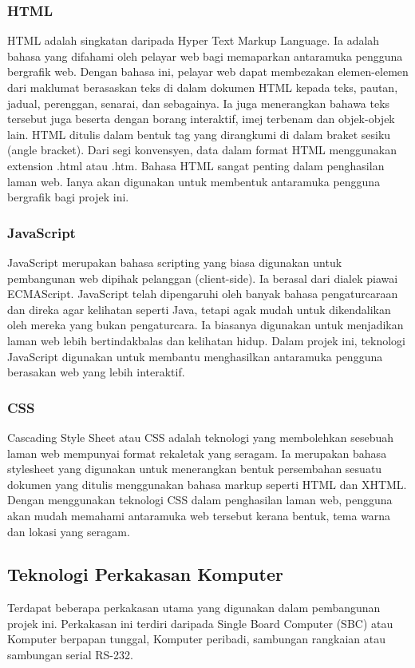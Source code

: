 \subsubsection{HTML}
HTML adalah singkatan daripada Hyper Text Markup Language. Ia adalah bahasa yang difahami oleh pelayar web bagi memaparkan antaramuka pengguna bergrafik web. Dengan bahasa ini, pelayar web dapat membezakan elemen-elemen dari maklumat berasaskan teks di dalam dokumen HTML kepada teks, pautan, jadual, perenggan, senarai, dan sebagainya. Ia juga menerangkan bahawa teks tersebut juga beserta dengan borang interaktif, imej terbenam dan objek-objek lain. HTML ditulis dalam bentuk tag yang dirangkumi di dalam braket sesiku (angle bracket). Dari segi konvensyen, data dalam format HTML menggunakan extension .html atau .htm. Bahasa HTML sangat penting dalam penghasilan laman web. Ianya akan digunakan untuk membentuk antaramuka pengguna bergrafik bagi projek ini.

\subsubsection{JavaScript}
JavaScript merupakan bahasa scripting yang biasa digunakan untuk pembangunan web dipihak pelanggan (client-side). Ia berasal dari dialek piawai ECMAScript. JavaScript telah dipengaruhi oleh banyak bahasa pengaturcaraan dan direka agar kelihatan seperti Java, tetapi agak mudah untuk dikendalikan oleh mereka yang bukan pengaturcara. Ia biasanya digunakan untuk menjadikan laman web lebih bertindakbalas dan kelihatan hidup. Dalam projek ini, teknologi JavaScript digunakan untuk membantu menghasilkan antaramuka pengguna berasakan web yang lebih interaktif.

\subsubsection{CSS}
Cascading Style Sheet atau CSS adalah teknologi yang membolehkan sesebuah laman web mempunyai format rekaletak yang seragam. Ia merupakan bahasa stylesheet yang digunakan untuk menerangkan bentuk persembahan sesuatu dokumen yang ditulis menggunakan bahasa markup seperti HTML dan XHTML. Dengan menggunakan teknologi CSS dalam penghasilan laman web, pengguna akan mudah memahami antaramuka web tersebut kerana bentuk, tema warna dan lokasi yang seragam.

\subsection{Teknologi Perkakasan Komputer}
Terdapat beberapa perkakasan utama yang digunakan dalam pembangunan projek ini. Perkakasan ini terdiri daripada Single Board Computer (SBC) atau Komputer berpapan tunggal, Komputer peribadi, sambungan rangkaian atau sambungan serial RS-232.


